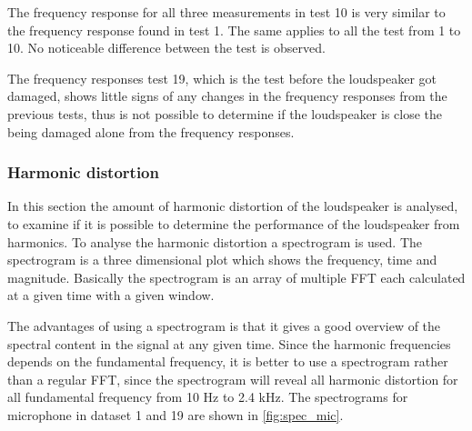 The frequency response for all three measurements in test 10 is very similar to the frequency response found in test 1. The same applies to all the test from 1 to 10. No noticeable difference between the test is observed.

%	
%	
%	

The frequency responses test 19, which is the test before the loudspeaker got damaged, shows little signs of any changes in the frequency responses from the previous tests, thus is not possible to determine if the loudspeaker is close the being damaged alone from the frequency responses.


\subsubsection{Harmonic distortion}

In this section the amount of harmonic distortion of the loudspeaker is analysed, to examine if it is possible to determine the performance of the loudspeaker from harmonics. To analyse the harmonic distortion a spectrogram is used. The spectrogram is a three dimensional plot which shows the frequency, time and magnitude. Basically the spectrogram is an array of multiple FFT each calculated at a given time with a given window.

The advantages of using a spectrogram is that it gives a good overview of the spectral content in the signal at any given time. Since the harmonic frequencies depends on the fundamental frequency, it is better to use a spectrogram rather than a regular FFT, since the spectrogram will reveal all harmonic distortion for all fundamental frequency from 10 Hz to 2.4 kHz. The spectrograms for microphone in dataset 1 and 19 are shown in \autoref{fig:spec_mic}.

